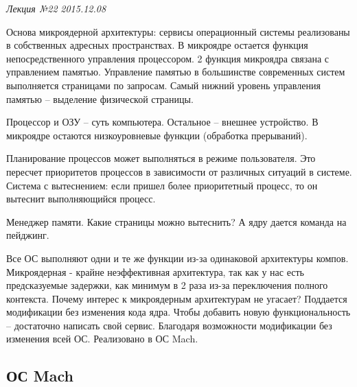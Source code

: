 \clearpage
\begin{flushright}
	\textit{Лекция №22}
	\textit{2015.12.08}
\end{flushright}

Основа микроядерной архитектуры: сервисы операционный системы реализованы в собственных адресных пространствах. В микроядре остается функция непосредственного управления процессором.
2 функция микроядра связана с управлением памятью. Управление памятью в большинстве современных систем выполняется страницами по запросам. Самый нижний уровень управления памятью – выделение физической страницы.

Процессор и ОЗУ – суть компьютера. Остальное – внешнее устройство. В микроядре остаются низкоуровневые функции (обработка прерываний).

Планирование процессов может выполняться в режиме пользователя. Это пересчет приоритетов процессов в зависимости от различных ситуаций в системе.
Система с вытеснением: если пришел более приоритетный процесс, то он вытеснит выполняющийся процесс.

Менеджер памяти. Какие страницы можно вытеснить? А ядру дается команда на пейджинг.

Все ОС выполняют одни и те же функции из-за одинаковой архитектуры компов.
Микроядерная - крайне неэффективная архитектура, так как у нас есть предсказуемые задержки, как минимум в 2 раза из-за переключения полного контекста.
Почему интерес к микроядерным архитектурам не угасает? Поддается модификации без изменения кода ядра. Чтобы добавить новую функциональность – достаточно написать свой сервис. Благодаря возможности модификации без изменения всей ОС.
Реализовано в ОС Mach. 

\subsection{ОС Mach}

